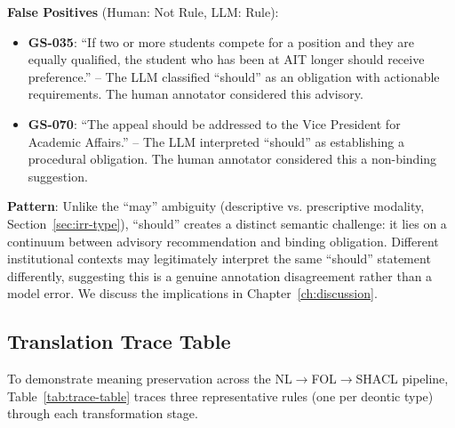 \textbf{False Positives} (Human: Not Rule, LLM: Rule):
\begin{itemize}
    \item \textbf{GS-035}: ``If two or more students compete for a position and they are equally qualified, the student who has been at AIT longer should receive preference.'' -- The LLM classified ``should'' as an obligation with actionable requirements. The human annotator considered this advisory.
    \item \textbf{GS-070}: ``The appeal should be addressed to the Vice President for Academic Affairs.'' -- The LLM interpreted ``should'' as establishing a procedural obligation. The human annotator considered this a non-binding suggestion.
\end{itemize}

\textbf{Pattern}: Unlike the ``may'' ambiguity (descriptive vs. prescriptive modality, Section~\ref{sec:irr-type}), ``should'' creates a distinct semantic challenge: it lies on a continuum between advisory recommendation and binding obligation. Different institutional contexts may legitimately interpret the same ``should'' statement differently, suggesting this is a genuine annotation disagreement rather than a model error. We discuss the implications in Chapter~\ref{ch:discussion}.

\subsection{Translation Trace Table}
\label{sec:trace-table}

To demonstrate meaning preservation across the NL$\rightarrow$FOL$\rightarrow$SHACL pipeline, Table~\ref{tab:trace-table} traces three representative rules (one per deontic type) through each transformation stage.


